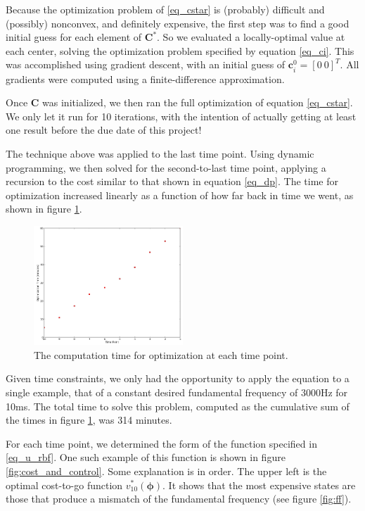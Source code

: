 \documentclass{article} %
\begin{document}
Because the optimization problem of \eqref{eq_cstar} is (probably) difficult and
(possibly) nonconvex, and definitely expensive, the first step was to find a good
initial guess for each element of $\bm{C}^*$. So we evaluated a locally-optimal
value at each center, solving the optimization problem specified by equation
\eqref{eq_ci}. This was accomplished using gradient descent, with an initial
guess of $\bm{c}_i^0 = \left[ 0 ~ 0 \right] ^T$. All gradients were computed using
a finite-difference approximation.

Once $\bm{C}$ was initialized, we then ran the full optimization of equation
\eqref{eq_cstar}. We only let it run for 10 iterations, with the intention of
actually getting at least one result before the due date of this project!

The technique above was applied to the last time point. Using dynamic programming,
we then solved for the second-to-last time point, applying a recursion to the cost
similar to that shown in equation \eqref{eq_dp}. The time for optimization increased
linearly as a function of how far back in time we went, as shown in figure \ref{fig:optimization_time}.

\begin{figure}[h]
\centering
\includegraphics[width=0.5\textwidth]{images/optimization_time.png}
\caption{The computation time for optimization at each time point.}
\label{fig:optimization_time}
\end{figure}

Given time constraints, we only had the opportunity to apply the equation to a single
example, that of a constant desired fundamental frequency of 3000Hz for 10ms. The total
time to solve this problem, computed as the cumulative sum of the times in figure
\ref{fig:optimization_time}, was 314 minutes.

For each time point, we determined the form of the function specified in \eqref{eq_u_rbf}. One
such example of this function is shown in figure \ref{fig:cost_and_control}. Some explanation
is in order. The upper left is the optimal cost-to-go function $v_{10}^*(\bm{\phi})$. It
shows that the most expensive states are those that produce a mismatch of the fundamental
frequency (see figure \ref{fig:ff}).
\end{document}
